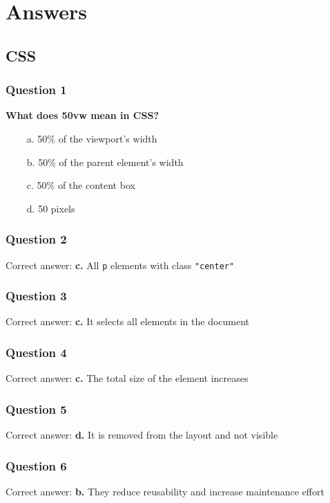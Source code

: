 \documentclass{article}
\newcommand{\cmark}{\textcolor{green}{\ding{51}}} %
\newcommand{\xmark}{\textcolor{red}{\ding{55}}}   %
\begin{document}
\section{Answers}

\subsection{CSS}

\subsubsection*{Question 1}
\textbf{What does 50vw mean in CSS?}
\begin{itemize}
  \item[\cmark\ a.] 50\% of the viewport’s width
  \item[\xmark\ b.] 50\% of the parent element’s width
  \item[\xmark\ c.] 50\% of the content box
  \item[\xmark\ d.] 50 pixels
\end{itemize}

\subsubsection*{Question 2}
Correct answer: \textbf{c.} All \texttt{p} elements with class \texttt{"center"}

\subsubsection*{Question 3}
Correct answer: \textbf{c.} It selects all elements in the document

\subsubsection*{Question 4}
Correct answer: \textbf{c.} The total size of the element increases

\subsubsection*{Question 5}
Correct answer: \textbf{d.} It is removed from the layout and not visible

\subsubsection*{Question 6}
Correct answer: \textbf{b.} They reduce reusability and increase maintenance effort
\end{document}
